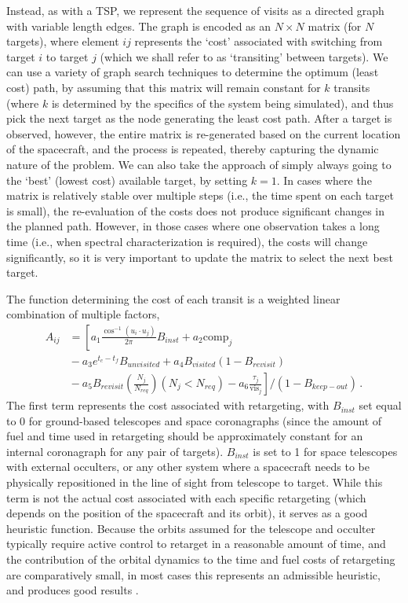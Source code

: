 Instead, as with a TSP, we represent the sequence of visits as a directed graph with variable length edges.  The graph is encoded as an $N \times N$ matrix (for $N$ targets), where element $ij$ represents the `cost' associated with switching from target $i$ to target $j$ (which we shall refer to as `transiting' between targets).  We can use a variety of graph search techniques to determine the optimum (least cost) path, by assuming that this matrix will remain constant for $k$ transits (where $k$ is determined by the specifics of the system being simulated), and thus pick the next target as the node generating the least cost path.  After a target is observed, however, the entire matrix is re-generated based on the current location of the spacecraft, and the process is repeated, thereby capturing the dynamic nature of the problem.  We can also take the approach of simply always going to the `best' (lowest cost) available target, by setting $k = 1$.  In cases where the matrix is relatively stable over multiple steps (i.e., the time spent on each target is small), the re-evaluation of the costs does not produce significant changes in the planned path.  However, in those cases where one observation takes a long time (i.e., when spectral characterization is required), the costs will change significantly, so it is very important to update the matrix to select the next best target.

The function determining the cost of each transit is a weighted linear combination of multiple factors,
\begin{equation}\label{eq:costfunc}
\begin{split}
A_{ij}  &= \left[ a_1 \frac{\cos^{-1}\left(u_i \cdot u_j\right)}{2\pi}B_{inst} + a_2 \textrm{comp}_j  \right. \\ 
&{} - a_3 e^{t_c-t_f} B_{unvisited} +  a_4 B_{visited}(1-B_{revisit})\\
&\left.{}  - a_5 B_{revisit} \left(\frac{N_j}{N_{req}} \right)(N_j < N_{req}) - a_6 \frac{\tau_j}{\textrm{vis}_j} \right] /(1-B_{keep-out}) \, .
\end{split}
\end{equation}
The first term represents the cost associated with retargeting, with $B_{inst}$ set equal to 0 for ground-based telescopes and space coronagraphs (since the amount of fuel and time used in retargeting should be approximately constant for an internal coronagraph for any pair of targets). $B_{inst}$ is set to 1 for space telescopes with external occulters, or any other system where a spacecraft needs to be physically repositioned in the line of sight from telescope to target.  While this term is not the actual cost associated with each specific retargeting (which depends on the position of the spacecraft and its orbit), it serves as a good heuristic function.  Because the orbits assumed for the telescope and occulter typically require active control to retarget in a reasonable amount of time, and the contribution of the orbital dynamics to the time and fuel costs of retargeting are comparatively small, in most cases this represents an admissible heuristic, and produces good results \citep{kolemen2007}. 

